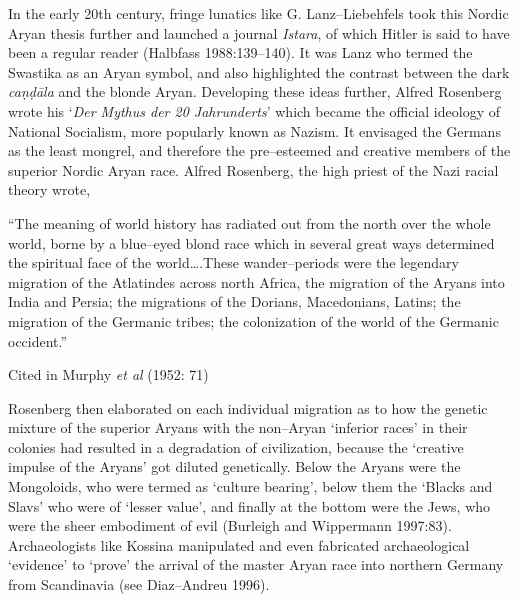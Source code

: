 In the early 20th century, fringe lunatics like G. Lanz–Liebehfels took this Nordic Aryan thesis further and launched a journal \textit{Istara}, of which Hitler is said to have been a regular reader (Halbfass 1988:139–140). It was Lanz who termed the Swastika as an Aryan symbol, and also highlighted the contrast between the dark \textit{caṇḍāla} and the blonde Aryan. Developing these ideas further, Alfred Rosenberg wrote his ‘\textit{Der Mythus der 20 Jahrunderts}’ which became the official ideology of National Socialism, more popularly known as Nazism. It envisaged the Germans as the least mongrel, and therefore the pre–esteemed and creative members of the superior Nordic Aryan race. Alfred Rosenberg, the high priest of the Nazi racial theory wrote,

\begin{myquote}
“The meaning of world history has radiated out from the north over the whole world, borne by a blue–eyed blond race which in several great ways determined the spiritual face of the world….These wander–periods were the legendary migration of the Atlatindes across north Africa, the migration of the Aryans into India and Persia; the migrations of the Dorians, Macedonians, Latins; the migration of the Germanic tribes; the colonization of the world of the Germanic occident.” 
\begin{myquote}
Cited in Murphy \textit{et al }(1952: 71)
\end{myquote}
\end{myquote}

Rosenberg then elaborated on each individual migration as to how the genetic mixture of the superior Aryans with the non–Aryan ‘inferior races’ in their colonies had resulted in a degradation of civilization, because the ‘creative impulse of the Aryans’ got diluted genetically. Below the Aryans were the Mongoloids, who were termed as ‘culture bearing’, below them the ‘Blacks and Slavs’ who were of ‘lesser value’, and finally at the bottom were the Jews, who were the sheer embodiment of evil (Burleigh and Wippermann 1997:83). Archaeologists like Kossina manipulated and even fabricated archaeological ‘evidence’ to ‘prove’ the arrival of the master Aryan race into northern Germany from Scandinavia (see Diaz–Andreu 1996).

